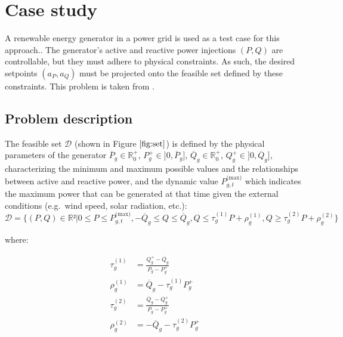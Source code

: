 \documentclass[
]{article}
\begin{document}
\section{Case study}\label{case-study}

A renewable energy generator in a power grid is used as a test case for
this approach.. The generator's active and reactive power injections
\((P,Q)\) are controllable, but they must adhere to physical
constraints. As such, the desired setpoints \((a_P, a_Q)\) must be
projected onto the feasible set defined by these constraints. This
problem is taken from \autocite{henryGymANMReinforcementLearning2021}.

\subsection{Problem description}\label{problem-description}

The feasible set \(\mathcal{D}\) (shown in Figure \(\ref{fig:set}\)) is
defined by the physical parameters of the generator
\(\overline{P}_g \in \mathbb{R}_0^+\),
\(P^+_g \in ]0, \overline{P}_g]\),
\(\overline{Q}_g \in \mathbb{R}_0^+\),
\(Q^+_g \in ]0, \overline{Q}_g]\), characterizing the minimum and
maximum possible values and the relationships between active and
reactive power, and the dynamic value \(P^{\textrm{(max)}}_{g,t}\) which
indicates the maximum power that can be generated at that time given the
external conditions (e.g.~wind speed, solar radiation, etc.):
\begin{equation}
\mathcal{D} = \{(P, Q) \in \mathbb{R}² | 0 \leq P \leq P^{\textrm{(max)}}_{g,t}, -\overline{Q}_g \leq Q \leq \overline{Q}_g, Q \leq \tau^{(1)}_g P + \rho_g^{(1)}, Q \geq \tau^{(2)}_g P + \rho_g^{(2)}\}
\end{equation}

where:

\begin{align}
    \tau^{(1)}_g &= \frac{Q_g^+ - \overline{Q}_g}{\overline{P_g} - P_g^+}\\
    \rho^{(1)}_g &= \overline{Q}_g - \tau^{(1)}_gP_g^+\\
    \tau^{(2)}_g &= \frac{\overline{Q}_g -Q_g^+ }{\overline{P_g} - P_g^+}\\
    \rho^{(2)}_g &= -\overline{Q}_g - \tau^{(2)}_gP_g^+  \\
\end{align}
\end{document}

